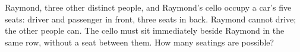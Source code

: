 Raymond, three other distinct people, and Raymond's cello occupy a car's five seats: driver and passenger in front, three seats in back. Raymond cannot drive; the other people can. The cello must sit immediately beside Raymond in the same row, without a seat between them. How many seatings are possible?
